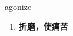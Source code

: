 
\begin{frame}
{\huge agonize}
\begin{center}
\begin{enumerate}\Large
  \item \textbf{折磨，使痛苦}
\end{enumerate}
\end{center}
\end{frame}
